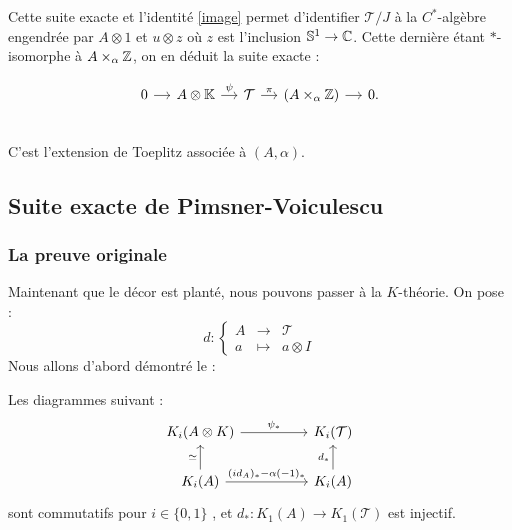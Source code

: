 Cette suite exacte et l'identité \ref{image} permet d'identifier $\mathcal T / J$ à la $C^*$-algèbre engendrée par $A\otimes 1$ et $u\otimes z$ où $z$ est l'inclusion $\mathbb S^1 \rightarrow \mathbb C$. Cette dernière étant $*$-isomorphe à $A\times_\alpha \mathbb Z$, on en déduit la suite exacte :

\[\begin{tikzcd}[column sep=small]
0 \arrow{r} &  A\otimes \K \arrow{r}{\psi} &  \mathcal T \arrow{r}{\pi}  &  (A\times _\alpha \Z) \arrow{r} & 0. \\ 
\end{tikzcd}\] 
C'est l'extension de Toeplitz associée à $(A,\alpha)$.
\subsection{Suite exacte de Pimsner-Voiculescu}
\subsubsection{La preuve originale}

Maintenant que le décor est planté, nous pouvons passer à la $K$-théorie. 
On pose :  \[d : \left\{\begin{array}{rcl}A & \rightarrow & \mathcal T \\ a & \mapsto & a\otimes I\end{array}\right.\]
Nous allons d'abord démontré le :

\begin{lem}\label{diagramme}
Les diagrammes suivant :
\[\begin{tikzcd}[column sep = huge]
K_i(A\otimes K) \arrow{r}{\psi_*}& K_i(\mathcal T) \\
K_i(A)   \arrow{u}{\simeq}\arrow{r}{(id_A)_*-\alpha(-1)_*}& K_i(A) \arrow{u}{d_*}
\end{tikzcd}
\]
sont commutatifs pour $i\in\{0,1\}$ , et $d_* : K_1(A)\rightarrow K_1(\mathcal T)$ est injectif.
\end{lem}

